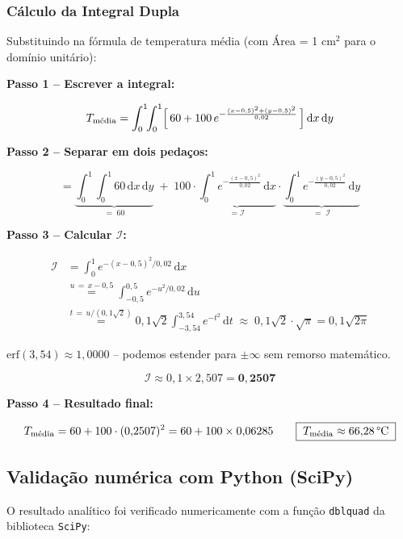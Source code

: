 \subsubsection{Cálculo da Integral Dupla}
Substituindo na fórmula de temperatura média (com Área = 1 cm$^2$ para o domínio unitário):
\begin{caixamath}
    \textbf{Passo 1 -- Escrever a integral:}

    \[
    T_{\text{média}}
    = \int_0^1\!\!\int_0^1
        \Bigl[\,60 + 100\,e^{-\frac{(x-0{,}5)^2+(y-0{,}5)^2}{0{,}02}}\,\Bigr]
        \,\mathrm{d}x\,\mathrm{d}y
    \]

    \textbf{Passo 2 -- Separar em dois pedaços:}

    \[
    = \underbrace{\int_0^1\!\!\int_0^1 60\,\mathrm{d}x\,\mathrm{d}y}_{=\;60}
    \;+\;
    100
    \cdot
    \underbrace{\int_0^1 e^{-\frac{(x-0{,}5)^2}{0{,}02}}\,\mathrm{d}x}_{=\mathcal{I}}
    \cdot
    \underbrace{\int_0^1 e^{-\frac{(y-0{,}5)^2}{0{,}02}}\,\mathrm{d}y}_{=\;\mathcal{I}}
    \]

    \textbf{ Passo 3 -- Calcular $\mathcal{I}$:}

    \begin{align*}
    \mathcal{I}
    &= \int_0^1 e^{-(x-0{,}5)^2/0{,}02}\,\mathrm{d}x \\[6pt]
    &\overset{u\,=\,x-0{,}5}{=}
        \int_{-0{,}5}^{0{,}5} e^{-u^2/0{,}02}\,\mathrm{d}u \\[6pt]
    &\overset{t\,=\,u/(0{,}1\sqrt{2})}{=}
        0{,}1\sqrt{2}
        \int_{-3{,}54}^{3{,}54} e^{-t^2}\,\mathrm{d}t
        \;\approx\;
        0{,}1\sqrt{2}\cdot\sqrt{\pi}
        = 0{,}1\sqrt{2\pi}
    \end{align*}


{\small\color{gray}$\text{erf}(3{,}54) \approx 1{,}0000$ -- podemos estender para
$\pm\infty$ sem remorso matemático.}

\[
  \mathcal{I} \approx 0{,}1 \times 2{,}507 = \mathbf{0{,}2507}
\]

\textbf{Passo 4 -- Resultado final:}

\[
  T_{\text{média}}
  = 60 + 100 \cdot (0{,}2507)^2
  = 60 + 100 \times 0{,}06285
  \qquad
  \boxed{\;T_{\text{média}} \approx 66{,}28\,\text{\textdegree C}\;}
\]
\end{caixamath}
\newpage

\subsection{Validação numérica com Python (SciPy)\cite{numpy}}
O resultado analítico foi verificado numericamente com a função \texttt{dblquad} da biblioteca \texttt{SciPy}:

